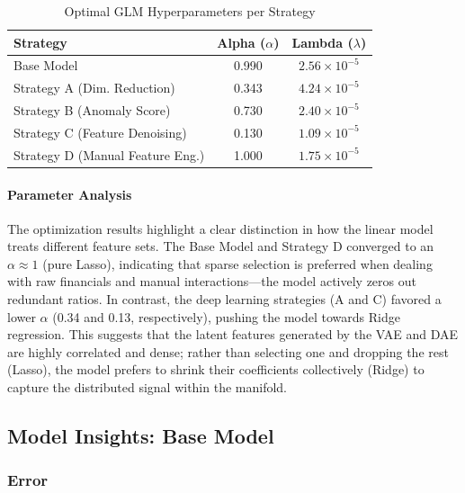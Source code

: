 \documentclass{report}\usepackage[]{graphicx}\usepackage[]{xcolor}
\begin{document}
\begin{table}[h]
    \centering
    \caption{Optimal GLM Hyperparameters per Strategy}
    \label{tab:glm_params}
    \begin{tabular}{lcc}
        \hline
        \textbf{Strategy} & \textbf{Alpha ($\alpha$)} & \textbf{Lambda ($\lambda$)} \\
        \hline
        Base Model & 0.990 & $2.56 \times 10^{-5}$ \\
        Strategy A (Dim. Reduction) & 0.343 & $4.24 \times 10^{-5}$ \\
        Strategy B (Anomaly Score) & 0.730 & $2.40 \times 10^{-5}$ \\
        Strategy C (Feature Denoising) & 0.130 & $1.09 \times 10^{-5}$ \\
        Strategy D (Manual Feature Eng.) & 1.000 & $1.75 \times 10^{-5}$ \\
        \hline
    \end{tabular}
\end{table}

\paragraph{Parameter Analysis}
The optimization results highlight a clear distinction in how the linear model treats different feature sets. The Base Model and Strategy D converged to an $\alpha \approx 1$ (pure Lasso), indicating that sparse selection is preferred when dealing with raw financials and manual interactions—the model actively zeros out redundant ratios. In contrast, the deep learning strategies (A and C) favored a lower $\alpha$ (0.34 and 0.13, respectively), pushing the model towards Ridge regression. This suggests that the latent features generated by the VAE and DAE are highly correlated and dense; rather than selecting one and dropping the rest (Lasso), the model prefers to shrink their coefficients collectively (Ridge) to capture the distributed signal within the manifold.


\subsection{Model Insights: Base Model}

\subsubsection{Error}
\end{document}
